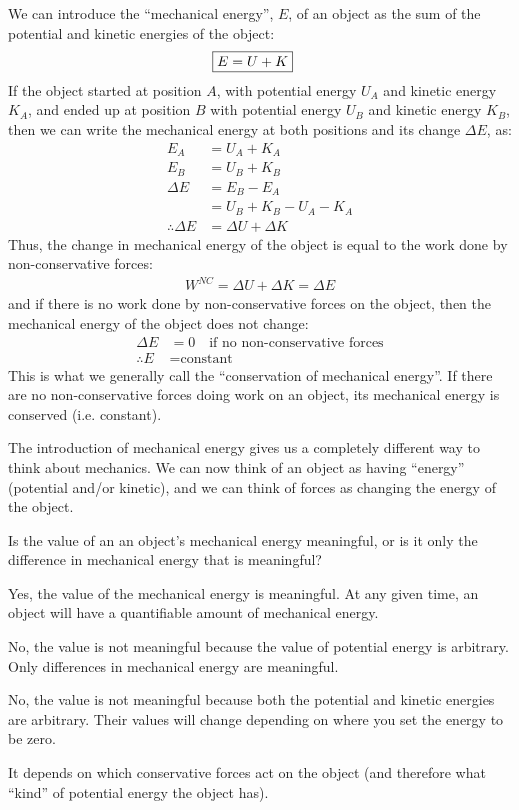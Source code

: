 We can introduce the ``mechanical energy'', $E$, of an object as the sum of the potential and kinetic energies of the object:
\begin{align}
\Aboxed{E = U+K}
\end{align}
If the object started at position $A$, with potential energy $U_A$ and kinetic energy $K_A$, and ended up at position $B$ with potential energy $U_B$ and kinetic energy $K_B$, then we can write the mechanical energy at both positions and its change $\Delta E$, as:
\begin{align*}
E_A &= U_A + K_A\\
E_B &= U_B + K_B\\
\Delta E &= E_B - E_A \\
&= U_B + K_B - U_A - K_A\\
\therefore \Delta E &= \Delta U + \Delta K
\end{align*}
Thus, the change in mechanical energy of the object is equal to the work done by non-conservative forces:
\begin{align*}
W^{NC} = \Delta U + \Delta K = \Delta E
\end{align*}
and if there is no work done by non-conservative forces on the object, then the mechanical energy of the object does not change:
\begin{align*}
\Delta E &= 0\quad\text{if no non-conservative forces}\\
\therefore E &= \text{constant}
\end{align*}
This is what we generally call the ``conservation of mechanical energy''. If there are no non-conservative forces doing work on an object, its mechanical energy is conserved (i.e. constant). 

The introduction of mechanical energy gives us a completely different way to think about mechanics. We can now think of an object as having ``energy'' (potential and/or kinetic), and we can think of forces as changing the energy of the object.

\begin{checkpoint}
\begin{MCquestion}{Is the value of an an object's mechanical energy meaningful, or is it only the difference in mechanical energy that is meaningful?}
\item Yes, the value of the mechanical energy is meaningful. At any given time, an object will have a quantifiable amount of mechanical energy.
\item No, the value is not meaningful because the value of potential energy is arbitrary. Only differences in mechanical energy are meaningful. \correct
\item No, the value is not meaningful because both the potential and kinetic energies are arbitrary. Their values will change depending on where you set the energy to be zero.
\item It depends on which conservative forces act on the object (and therefore what ``kind'' of potential energy the object has).
\end{MCquestion}
\end{checkpoint}

